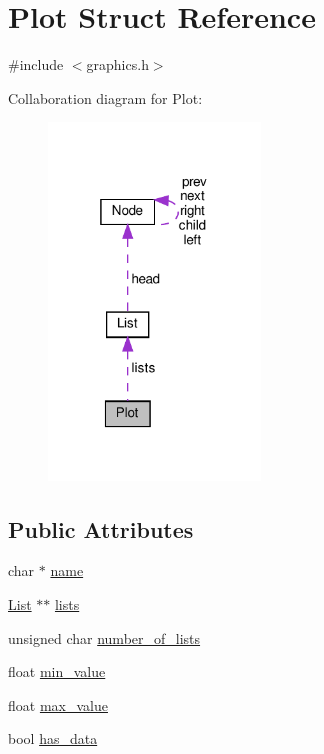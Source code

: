 \hypertarget{structPlot}{}\section{Plot Struct Reference}
\label{structPlot}


{\ttfamily \#include $<$graphics.\+h$>$}



Collaboration diagram for Plot\+:
\nopagebreak
\begin{figure}[H]
\begin{center}
\leavevmode
\includegraphics[width=160pt]{structPlot__coll__graph}
\end{center}
\end{figure}
\subsection*{Public Attributes}
\begin{DoxyCompactItemize}
\item 
char $\ast$ \hyperlink{structPlot_aa4c1f8e3360f2c41e22e041e1deba9b3}{name}
\item 
\hyperlink{structList}{List} $\ast$$\ast$ \hyperlink{structPlot_acf1191deb7d04e69106419aa87d3729d}{lists}
\item 
unsigned char \hyperlink{structPlot_ae7098880dbd6c20d2a1447fafea20e7b}{number\+\_\+of\+\_\+lists}
\item 
float \hyperlink{structPlot_a2fdd041a89c93f3b540ce57a59bce41c}{min\+\_\+value}
\item 
float \hyperlink{structPlot_ad174b1c447b62ea0e4a49fd3e324ddf0}{max\+\_\+value}
\item 
bool \hyperlink{structPlot_ab710f00d48f56ceb2c8d9345e6334e45}{has\+\_\+data}
\end{DoxyCompactItemize}


